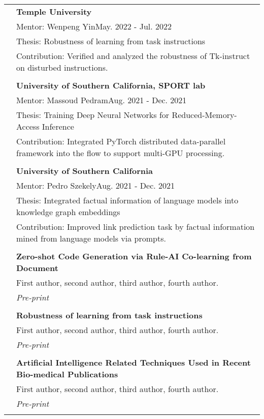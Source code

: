 \documentclass[letterpaper, 11pt]{article}
\begin{document}
\begin{longtable}{p{1.3in}p{4.8in}}
& \textbf{Temple University} \\
& Mentor: Wenpeng Yin\hfill May. 2022 - Jul. 2022 \\
& Thesis: Robustness of learning from task instructions\hfill \\
& Contribution: Verified and analyzed the robustness of Tk-instruct on disturbed instructions. \\
& \\

& \textbf{University of Southern California, SPORT lab} \\
& Mentor: Massoud Pedram\hfill Aug. 2021 - Dec. 2021 \\
& Thesis: Training Deep Neural Networks for Reduced-Memory-Access Inference\hfill \\
& Contribution: Integrated PyTorch distributed data-parallel framework into the flow to support multi-GPU processing.\\
& \\

& \textbf{University of Southern California} \\
& Mentor: Pedro Szekely\hfill Aug. 2021 - Dec. 2021 \\
& Thesis: Integrated factual information of language models into knowledge graph embeddings\hfill \\
& Contribution: Improved link prediction task by factual information mined from language models via prompts.\\
& \\

\nohyphens{\color{black}{Publications}} 

& \textbf{Zero-shot Code Generation via Rule-AI Co-learning from Document} \\
& First author, second author, third author, fourth author. \\
& \textit{Pre-print}\\
& \\


& \textbf{Robustness of learning from task instructions} \\
& First author, second author, third author, fourth author. \\
& \textit{Pre-print}\\
& \\

& \textbf{Artificial Intelligence Related Techniques Used in Recent Bio-medical Publications} \\
& First author, second author, third author, fourth author. \\
& \textit{Pre-print}\\
& \\



\end{longtable}
\end{document}
